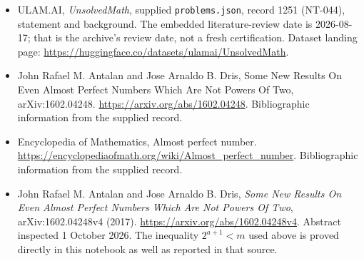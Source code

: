 \documentclass[11pt,a4paper]{article}
\begin{document}
{\small

\begin{itemize}

\item[\hypertarget{source:1251:1}{S1}] ULAM.AI, \emph{UnsolvedMath}, supplied \texttt{problems.json}, record 1251 (NT-044), statement and background. The embedded literature-review date is 2026-08-17; that is the archive’s review date, not a fresh certification. Dataset landing page: \url{https://huggingface.co/datasets/ulamai/UnsolvedMath}.

\item[\hypertarget{source:1251:2}{S2}] John Rafael M. Antalan and Jose Arnaldo B. Dris, Some New Results On Even Almost Perfect Numbers Which Are Not Powers Of Two, arXiv:1602.04248. \url{https://arxiv.org/abs/1602.04248}. Bibliographic information from the supplied record.

\item[\hypertarget{source:1251:3}{S3}] Encyclopedia of Mathematics, Almost perfect number. \url{https://encyclopediaofmath.org/wiki/Almost_perfect_number}. Bibliographic information from the supplied record.


\item[E1] John Rafael M. Antalan and Jose Arnaldo B. Dris,
\emph{Some New Results On Even Almost Perfect Numbers Which Are Not
Powers Of Two}, arXiv:1602.04248v4 (2017).
\url{https://arxiv.org/abs/1602.04248v4}. Abstract inspected
1 October 2026. The inequality $2^{a+1}<m$ used above is proved
directly in this notebook as well as reported in that source.

\end{itemize}

}

\label{end:1251}
\end{document}
